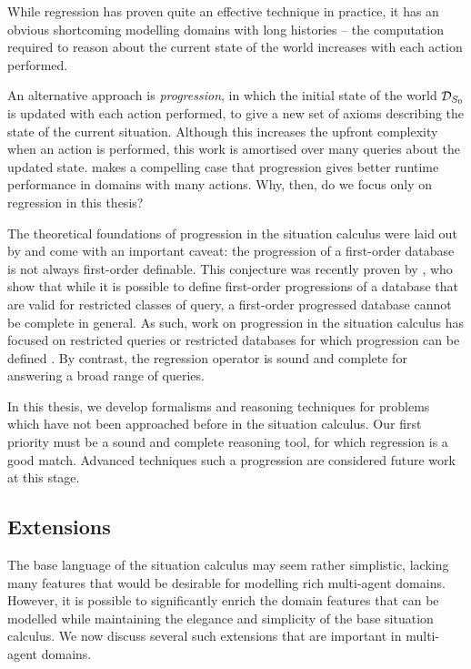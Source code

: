 While regression has proven quite an effective technique in practice,
it has an obvious shortcoming modelling domains with long histories
-- the computation required to reason about the current state of the
world increases with each action performed.

An alternative approach is \emph{progression}, in which the initial
state of the world $\mathcal{D}_{S_{0}}$ is updated with each action performed,
to give a new set of axioms describing the state of the current situation.
Although this increases the upfront complexity when an action is performed,
this work is amortised over many queries about the updated state.
\citet{thielscher04case_for_progression} makes a compelling case
that progression gives better runtime performance in domains with
many actions. Why, then, do we focus only on regression in this thesis?

The theoretical foundations of progression in the situation calculus
were laid out by \citet{reiter97progression} and come with an important
caveat: the progression of a first-order database is not always first-order
definable. This conjecture was recently proven by \citet{vassos08progression_future_queries},
who show that while it is possible to define first-order progressions
of a database that are valid for restricted classes of query, a first-order
progressed database cannot be complete in general. As such, work on
progression in the situation calculus has focused on restricted queries
or restricted databases for which progression can be defined \citep{liu05sc_progression_knowledge,vassos07progression,vassos08fo_strong_progression}.
By contrast, the regression operator is sound and complete for answering
a broad range of queries.

In this thesis, we develop formalisms and reasoning techniques for
problems which have not been approached before in the situation calculus.
Our first priority must be a sound and complete reasoning tool, for
which regression is a good match. Advanced techniques such a progression
are considered future work at this stage.


\subsection{Extensions\label{sec:Background:Extensions}}

The base language of the situation calculus may seem rather simplistic,
lacking many features that would be desirable for modelling rich multi-agent
domains. However, it is possible to significantly enrich the domain
features that can be modelled while maintaining the elegance and simplicity
of the base situation calculus. We now discuss several such extensions
that are important in multi-agent domains.


